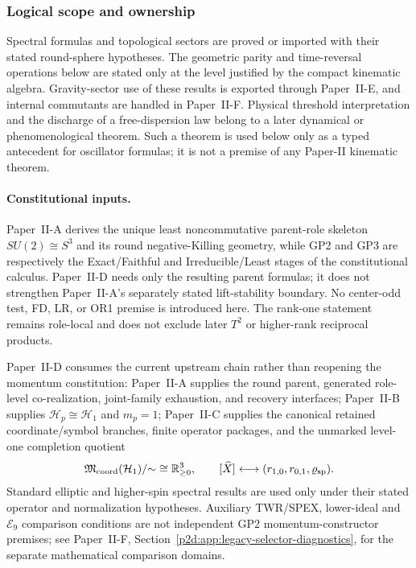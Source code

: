 \documentclass[12pt,a4paper]{article}
\begin{document}
\subsubsection{Logical scope and ownership}
Spectral formulas and topological sectors are proved or imported with their
stated round-sphere hypotheses.  The geometric parity and time-reversal
operations below are stated only at the level justified by the compact
kinematic algebra.  Gravity-sector use of these results is exported through
Paper~II-E, and internal commutants are handled in Paper~II-F.  Physical threshold interpretation and the discharge of a free-dispersion law
belong to a later dynamical or phenomenological theorem.  Such a theorem is
used below only as a typed antecedent for oscillator formulas; it is not a
premise of any Paper-II kinematic theorem.

\paragraph{Constitutional inputs.}
Paper~II-A derives the unique least noncommutative parent-role skeleton
\(SU(2)\cong S^3\) and its round negative-Killing geometry, while GP2 and GP3
are respectively the Exact/Faithful and Irreducible/Least stages of the
constitutional calculus.  Paper~II-D needs only the resulting parent formulas;
it does not strengthen Paper~II-A's separately stated lift-stability boundary.
No center-odd test, FD, LR, or OR1 premise is introduced here.  The rank-one
statement remains role-local and does not exclude later \(T^2\) or higher-rank
reciprocal products.

\begin{remark}
\label{p2:rem:iid-dependency-record}
Paper~II-D consumes the current upstream chain rather than reopening the
momentum constitution: Paper~II-A supplies the round parent, generated
role-level co-realization, joint-family exhaustion, and recovery interfaces;
Paper~II-B supplies
\(\mathcal H_p\cong\mathcal H_1\) and \(m_p=1\); Paper~II-C supplies
the canonical retained coordinate/symbol branches, finite operator packages,
and the unmarked level-one completion
quotient
\[
 \mathfrak M_{\rm coord}(\mathcal H_1)/{\sim}
 \cong \mathbb R_{\ge0}^{3},
 \qquad
 [\widehat X]\longleftrightarrow
 (r_{1,0},r_{0,1},\varrho_{\rm sp}).
\]
Standard elliptic and higher-spin spectral results are used only under their
stated operator and normalization hypotheses.  Auxiliary TWR/SPEX, lower-ideal and $\mathcal E_9$ comparison
conditions are not independent GP2 momentum-constructor premises;
see Paper~II-F, Section~\ref{p2d:app:legacy-selector-diagnostics},
for the separate mathematical comparison domains.
\end{remark}
\end{document}
